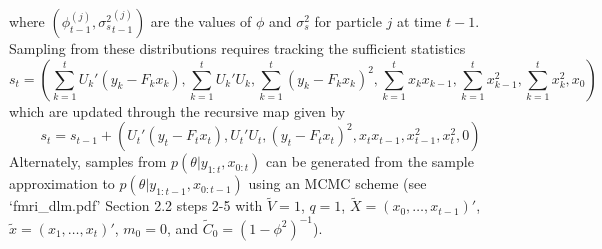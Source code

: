 \documentclass{article}
\begin{document}
where $\left(\phi_{t-1}^{(j)},{\sigma^2_s}_{t-1}^{(j)}\right)$ are the values of $\phi$ and $\sigma^2_s$ for particle $j$ at time $t-1$. Sampling from these distributions requires tracking the sufficient statistics \[s_t = \left(\sum_{k=1}^t U_k'(y_k - F_kx_k),\sum_{k=1}^t U_k'U_k,\sum_{k=1}^t (y_k - F_kx_k)^2,\sum_{k=1}^t x_kx_{k-1},\sum_{k=1}^t x_{k-1}^2,\sum_{k=1}^t x_k^2,x_0\right)\] which are updated through the recursive map given by \[s_t = s_{t-1} + \left(U_t'(y_t - F_tx_t),U_t'U_t,(y_t - F_tx_t)^2,x_tx_{t-1},x_{t-1}^2,x_t^2,0\right)\]
Alternately, samples from $p(\theta|y_{1:t},x_{0:t})$ can be generated from the sample approximation to $p(\theta|y_{1:t-1},x_{0:t-1})$ using an MCMC scheme (see `fmri\_dlm.pdf' Section 2.2 steps 2-5 with $\tilde{V} = 1$, $q = 1$, $\tilde{X} = (x_0,\ldots,x_{t-1})'$, $\tilde{x} = (x_1,\ldots,x_t)'$, $m_0 = 0$, and $\tilde{C}_0 = (1-\phi^2)^{-1}$).

\clearpage



\end{document}
